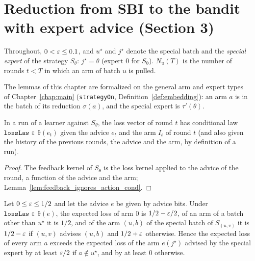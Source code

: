 \chapter{Reduction from SBI to the bandit with expert advice (Section 3)}
\label{chap:reduction}

Throughout, $0 < \varepsilon \le 0.1$, and $u^\star$ and $j^\star$ denote the special batch and the
\emph{special expert} of the strategy $S_\theta$: $j^\star = \theta$ (expert $0$ for $S_0$).
$N_u(T)$ is the number of rounds $t < T$ in which an arm of batch $u$ is pulled.

The lemmas of this chapter are formalized on the general arm and expert types of
Chapter~\ref{chap:main} (\texttt{strategyOn}, Definition~\ref{def:embedding}): an arm $a$ is in
the batch of its reduction $\sigma(a)$, and the special expert is $\tau'(\theta)$.

\begin{lemma}
  \label{lem:loss_law_cond}
  \leanok
  In a run of a learner against $S_\theta$, the loss vector of round $t$ has conditional law
  $\texttt{lossLaw ε θ}(e_t)$ given the advice $e_t$ and the arm $I_t$ of round $t$ (and also given
  the history of the previous rounds, the advice and the arm, by definition of a run).
\end{lemma}

\begin{proof}
  \leanok
  The feedback kernel of $S_\theta$ is the loss kernel applied to the advice of the round, a
  function of the advice and the arm; Lemma~\ref{lem:feedback_ignores_action_cond}.
\end{proof}

\begin{lemma}
  \label{lem:mean_loss}
  \leanok
  Let $0 \le \varepsilon \le 1/2$ and let the advice $e$ be given by advice bits. Under
  $\texttt{lossLaw ε θ}(e)$, the expected loss of arm $0$ is $1/2 - \varepsilon/2$, of an arm of a batch
  other than $u^\star$ it is $1/2$, and of the arm $(u, b)$ of the special batch of $S_{(u, v)}$ it
  is $1/2 - \varepsilon$ if $(u, v)$ advises $(u, b)$ and $1/2 + \varepsilon$ otherwise. Hence the expected loss
  of every arm $a$ exceeds the expected loss of the arm $e(j^\star)$ advised by the special expert
  by at least $\varepsilon/2$ if $a \notin u^\star$, and by at least $0$ otherwise.
\end{lemma}

